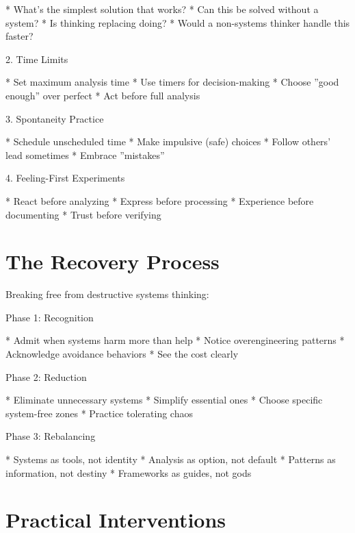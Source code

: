 \documentclass[12pt,oneside]{book}
\begin{document}
                    * What's the simplest solution that works?
                    * Can this be solved without a system?
                    * Is thinking replacing doing?
                    * Would a non-systems thinker handle this faster?

                2. Time Limits

                    * Set maximum analysis time
                    * Use timers for decision-making
                    * Choose ''good enough'' over perfect
                    * Act before full analysis

                3. Spontaneity Practice

                    * Schedule unscheduled time
                    * Make impulsive (safe) choices
                    * Follow others' lead sometimes
                    * Embrace ''mistakes''

                4. Feeling-First Experiments

                    * React before analyzing
                    * Express before processing
                    * Experience before documenting
                    * Trust before verifying

\section{The Recovery Process}

Breaking free from destructive systems thinking:

                Phase 1: Recognition

                    * Admit when systems harm more than help
                    * Notice overengineering patterns
                    * Acknowledge avoidance behaviors
                    * See the cost clearly

                Phase 2: Reduction

                    * Eliminate unnecessary systems
                    * Simplify essential ones
                    * Choose specific system-free zones
                    * Practice tolerating chaos

                Phase 3: Rebalancing

                    * Systems as tools, not identity
                    * Analysis as option, not default
                    * Patterns as information, not destiny
                    * Frameworks as guides, not gods

\section{Practical Interventions}
\end{document}
